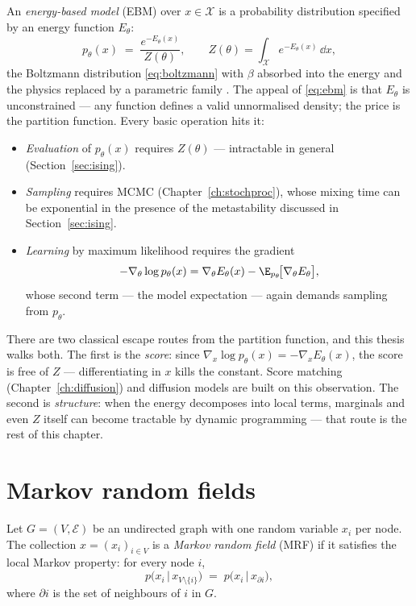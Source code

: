 An \emph{energy-based model} (EBM) over $x \in \mathcal{X}$ is a probability
distribution specified by an energy function $E_\theta$:
\begin{equation}
  p_\theta(x) \;=\; \frac{e^{-E_\theta(x)}}{Z(\theta)},
  \qquad
  Z(\theta) = \int_{\mathcal{X}} e^{-E_\theta(x)}\, \dd x ,
  \label{eq:ebm}
\end{equation}
the Boltzmann distribution \eqref{eq:boltzmann} with $\beta$ absorbed into
the energy and the physics replaced by a parametric family
\citep{ackley1985learning, lecun2006tutorial}. The appeal of
\eqref{eq:ebm} is that $E_\theta$ is unconstrained --- any function
defines a valid unnormalised density; the price is the partition function.
Every basic operation hits it:
\begin{itemize}
  \item \emph{Evaluation} of $p_\theta(x)$ requires $Z(\theta)$ ---
  intractable in general (Section~\ref{sec:ising}).
  \item \emph{Sampling} requires MCMC (Chapter~\ref{ch:stochproc}), whose
  mixing time can be exponential in the presence of the metastability
  discussed in Section~\ref{sec:ising}.
  \item \emph{Learning} by maximum likelihood requires the gradient
  \begin{equation}
    -\nabla_\theta \log p_\theta(x)
    = \nabla_\theta E_\theta(x)
    - \E_{p_\theta}\!\big[ \nabla_\theta E_\theta \big],
    \label{eq:ebm-gradient}
  \end{equation}
  whose second term --- the model expectation --- again demands sampling
  from $p_\theta$.
\end{itemize}
There are two classical escape routes from the partition function, and this
thesis walks both. The first is the \emph{score}: since
$\nabla_x \log p_\theta(x) = -\nabla_x E_\theta(x)$, the score is free of
$Z$ --- differentiating in $x$ kills the constant. Score matching
(Chapter~\ref{ch:diffusion}) and diffusion models are built on this
observation. The second is \emph{structure}: when the energy decomposes into
local terms, marginals and even $Z$ itself can become tractable by dynamic
programming --- that route is the rest of this chapter.

\section{Markov random fields}\label{sec:mrf}

\begin{definition}
Let $G = (V, \mathcal{E})$ be an undirected graph with one random variable
$x_i$ per node. The collection $x = (x_i)_{i \in V}$ is a \emph{Markov
random field} (MRF) if it satisfies the local Markov property: for every
node $i$,
\begin{equation}
  p\big(x_i \,\big|\, x_{V \setminus \{i\}}\big)
  \;=\; p\big(x_i \,\big|\, x_{\partial i}\big),
  \label{eq:local-markov}
\end{equation}
where $\partial i$ is the set of neighbours of $i$ in $G$.
\end{definition}

